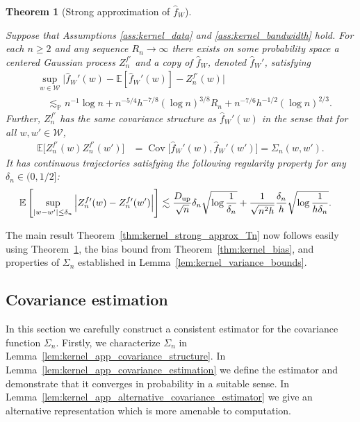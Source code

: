 \documentclass[11pt,lof]{puthesis}
\renewcommand{\P}{\ensuremath{\mathbb{P}}}
\newcommand{\E}{\ensuremath{\mathbb{E}}}
\newcommand{\cW}{\ensuremath{\mathcal{W}}}
\newcommand{\Du}{\ensuremath{D_{\textup{up}}}}
\DeclareMathOperator{\Cov}{Cov}
\theoremstyle{break}
\newtheorem{theorem}{Theorem}[section]
\theoremstyle{proof}
\begin{document}
\begin{theorem}[Strong approximation of $\hat f_W$]
\label{thm:kernel_app_strong_approx_fW}

Suppose that Assumptions \ref{ass:kernel_data} and \ref{ass:kernel_bandwidth}
hold. For each $n \geq 2$ and any sequence $R_n \to \infty$ there exists on
some probability space a centered Gaussian process $Z_n^{f\prime}$ and a copy
of $\hat f_W$, denoted $\hat f_W'$, satisfying
%
\begin{align*}
&\sup_{w \in \cW}
\Big|
\hat f_W'(w) - \E[\hat f_W'(w)]
- Z_n^{f\prime}(w)
\Big| \\
&\quad\lesssim_\P
n^{-1} \log n
+ n^{-5/4} h^{-7/8} (\log n)^{3/8} R_n
+ n^{-7/6} h^{-1/2} (\log n)^{2/3}.
\end{align*}
%
Further, $Z_n^{f\prime}$ has the same covariance
structure as
$\hat f_W'(w)$
in the sense that for all
$w, w' \in \cW$,
%
\begin{align*}
\E\big[Z_n^{f\prime}(w) Z_n^{f\prime}(w')\big]
&=
\Cov\Big[
\hat f_W'(w),
\hat f_W'(w')
\Big]
= \Sigma_n(w,w').
\end{align*}
%
It has continuous trajectories satisfying the following regularity property
for any $\delta_n \in (0, 1/2]$:
%
\begin{align*}
\E\left[
\sup_{|w-w'| \leq \delta_n}
\Big|
Z_n^{f\prime}(w)
- Z_n^{f\prime}(w')
\Big|
\right]
&\lesssim
\frac{\Du}{\sqrt n} \delta_n
\sqrt{\log \frac{1}{\delta_n}}
+ \frac{1}{\sqrt{n^2h}}
\frac{\delta_n}{h}
\sqrt{\log \frac{1}{h\delta_n}}.
\end{align*}
%
\end{theorem}

The main result Theorem~\ref{thm:kernel_strong_approx_Tn}
now follows easily using Theorem~\ref{thm:kernel_app_strong_approx_fW},
the bias bound from Theorem~\ref{thm:kernel_bias},
and properties of $\Sigma_n$ established in
Lemma~\ref{lem:kernel_variance_bounds}.

\subsection{Covariance estimation}
\label{sec:kernel_app_covariance_estimation}

In this section we carefully construct a consistent estimator for the
covariance function $\Sigma_n$. Firstly, we characterize $\Sigma_n$ in
Lemma~\ref{lem:kernel_app_covariance_structure}. In
Lemma~\ref{lem:kernel_app_covariance_estimation}
we define the estimator and demonstrate that it converges in probability in a
suitable sense. In Lemma~\ref{lem:kernel_app_alternative_covariance_estimator}
we give an
alternative representation which is more amenable to computation.
\end{document}
